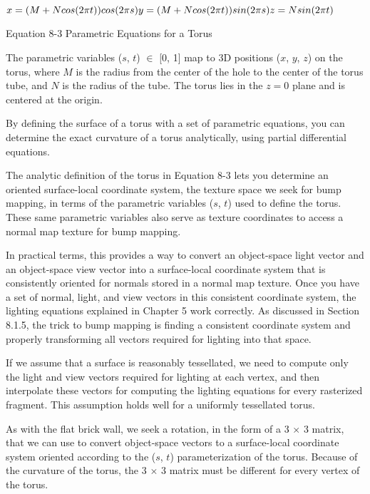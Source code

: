 \documentclass[../main.tex]{subfiles}
\begin{document}
\FloatBarrier
\begin{equationcaption}
$
x=(M+Ncos(2\pi t))cos(2\pi s) \newline
y=(M+Ncos(2\pi t))sin(2\pi s) \newline
z=Nsin(2\pi t)
$
\caption{Equation 8-3 Parametric Equations for a Torus}
\end{equationcaption}
\FloatBarrier

The parametric variables ($s$, $t$) $\in$ [0, 1] map to 3D positions ($x$, $y$, $z$) on the torus, where $M$ is the radius from the center of the hole to the center of the torus tube, and $N$ is the radius of the tube. The torus lies in the $z=0$ plane and is centered at the origin.

By defining the surface of a torus with a set of parametric equations, you can determine the exact curvature of a torus analytically, using partial differential equations.

The analytic definition of the torus in Equation 8-3 lets you determine an oriented surface-local coordinate system, the texture space we seek for bump mapping, in terms of the parametric variables ($s$, $t$) used to define the torus. These same parametric variables also serve as texture coordinates to access a normal map texture for bump mapping.

In practical terms, this provides a way to convert an object-space light vector and an object-space view vector into a surface-local coordinate system that is consistently oriented for normals stored in a normal map texture. Once you have a set of normal, light, and view vectors in this consistent coordinate system, the lighting equations explained in Chapter 5 work correctly. As discussed in Section 8.1.5, the trick to bump mapping is finding a consistent coordinate system and properly transforming all vectors required for lighting into that space.

If we assume that a surface is reasonably tessellated, we need to compute only the light and view vectors required for lighting at each vertex, and then interpolate these vectors for computing the lighting equations for every rasterized fragment. This assumption holds well for a uniformly tessellated torus.

As with the flat brick wall, we seek a rotation, in the form of a 3 $\times$ 3 matrix, that we can use to convert object-space vectors to a surface-local coordinate system oriented according to the ($s$, $t$) parameterization of the torus. Because of the curvature of the torus, the 3 $\times$ 3 matrix must be different for every vertex of the torus.
\end{document}
